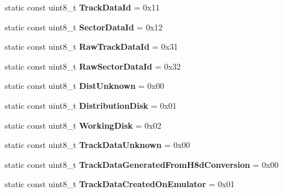 \begin{DoxyCompactItemize}
\item 
\hypertarget{classH17Disk_a302ca6b5d130750da7216c91630374e6}{}static const uint8\+\_\+t {\bfseries Track\+Data\+Id} = 0x11\label{classH17Disk_a302ca6b5d130750da7216c91630374e6}

\item 
\hypertarget{classH17Disk_aef3444308bb936ec9e80cab4b7230b4b}{}static const uint8\+\_\+t {\bfseries Sector\+Data\+Id} = 0x12\label{classH17Disk_aef3444308bb936ec9e80cab4b7230b4b}

\item 
\hypertarget{classH17Disk_a0a408dcfd99d390b9f266fb6db3972a4}{}static const uint8\+\_\+t {\bfseries Raw\+Track\+Data\+Id} = 0x31\label{classH17Disk_a0a408dcfd99d390b9f266fb6db3972a4}

\item 
\hypertarget{classH17Disk_a49f93facafda64ffc06a4a8c428d5986}{}static const uint8\+\_\+t {\bfseries Raw\+Sector\+Data\+Id} = 0x32\label{classH17Disk_a49f93facafda64ffc06a4a8c428d5986}

\item 
\hypertarget{classH17Disk_acd5a918e086c473bfbb792d9e65adfbc}{}static const uint8\+\_\+t {\bfseries Dist\+Unknown} = 0x00\label{classH17Disk_acd5a918e086c473bfbb792d9e65adfbc}

\item 
\hypertarget{classH17Disk_a5ad1666fc009b8d9ef74b4d7c40f3315}{}static const uint8\+\_\+t {\bfseries Distribution\+Disk} = 0x01\label{classH17Disk_a5ad1666fc009b8d9ef74b4d7c40f3315}

\item 
\hypertarget{classH17Disk_ad6726b8fddf981888c09ed73dae7b3a7}{}static const uint8\+\_\+t {\bfseries Working\+Disk} = 0x02\label{classH17Disk_ad6726b8fddf981888c09ed73dae7b3a7}

\item 
\hypertarget{classH17Disk_af68c66fb0b3f8e3bbe017595707775eb}{}static const uint8\+\_\+t {\bfseries Track\+Data\+Unknown} = 0x00\label{classH17Disk_af68c66fb0b3f8e3bbe017595707775eb}

\item 
\hypertarget{classH17Disk_acc335396cc8aad60bd1adb24014ef47d}{}static const uint8\+\_\+t {\bfseries Track\+Data\+Generated\+From\+H8d\+Conversion} = 0x00\label{classH17Disk_acc335396cc8aad60bd1adb24014ef47d}

\item 
\hypertarget{classH17Disk_a34e88c0f1230ed1632b588e5d98844d6}{}static const uint8\+\_\+t {\bfseries Track\+Data\+Created\+On\+Emulator} = 0x01\label{classH17Disk_a34e88c0f1230ed1632b588e5d98844d6}


\end{DoxyCompactItemize}
